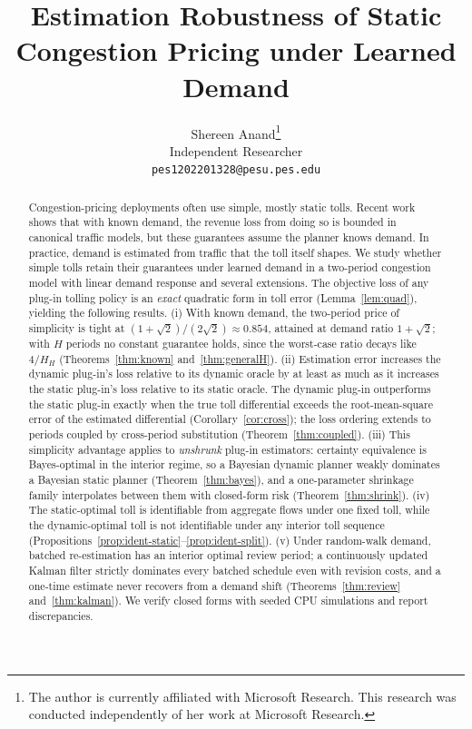 \documentclass[11pt]{article}
\title{Estimation Robustness of Static Congestion Pricing under Learned Demand}
\author{Shereen Anand\thanks{The author is currently affiliated with Microsoft Research. This research was conducted independently of her work at Microsoft Research.}\\Independent Researcher\\\texttt{pes1202201328@pesu.pes.edu}}
\date{}
\theoremstyle{definition}
\theoremstyle{remark}
\begin{document}
\maketitle

\begin{abstract}
Congestion-pricing deployments often use simple, mostly static tolls. Recent work shows that with known demand, the revenue loss from doing so is bounded in canonical traffic models, but these guarantees assume the planner knows demand. In practice, demand is estimated from traffic that the toll itself shapes. We study whether simple tolls retain their guarantees under learned demand in a two-period congestion model with linear demand response and several extensions. The objective loss of any plug-in tolling policy is an \emph{exact} quadratic form in toll error (Lemma~\ref{lem:quad}), yielding the following results. (i) With known demand, the two-period price of simplicity is tight at $(1+\sqrt2)/(2\sqrt2)\approx0.854$, attained at demand ratio $1+\sqrt2$; with $H$ periods no constant guarantee holds, since the worst-case ratio decays like $4/H_H$ (Theorems~\ref{thm:known} and~\ref{thm:generalH}). (ii) Estimation error increases the dynamic plug-in's loss relative to its dynamic oracle by at least as much as it increases the static plug-in's loss relative to its static oracle. The dynamic plug-in outperforms the static plug-in exactly when the true toll differential exceeds the root-mean-square error of the estimated differential (Corollary~\ref{cor:cross}); the loss ordering extends to periods coupled by cross-period substitution (Theorem~\ref{thm:coupled}). (iii) This simplicity advantage applies to \emph{unshrunk} plug-in estimators: certainty equivalence is Bayes-optimal in the interior regime, so a Bayesian dynamic planner weakly dominates a Bayesian static planner (Theorem~\ref{thm:bayes}), and a one-parameter shrinkage family interpolates between them with closed-form risk (Theorem~\ref{thm:shrink}). (iv) The static-optimal toll is identifiable from aggregate flows under one fixed toll, while the dynamic-optimal toll is not identifiable under any interior toll sequence (Propositions~\ref{prop:ident-static}--\ref{prop:ident-split}). (v) Under random-walk demand, batched re-estimation has an interior optimal review period; a continuously updated Kalman filter strictly dominates every batched schedule even with revision costs, and a one-time estimate never recovers from a demand shift (Theorems~\ref{thm:review} and~\ref{thm:kalman}). We verify closed forms with seeded CPU simulations and report discrepancies.
\end{abstract}
\end{document}
